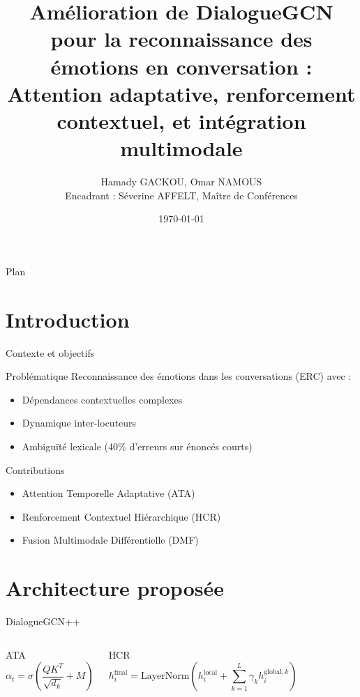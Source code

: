 \documentclass[10pt, aspectratio=169]{beamer} %
\title[Amélioration de DialogueGCN]{\large Amélioration de DialogueGCN pour la reconnaissance des émotions en conversation : \\ Attention adaptative, renforcement contextuel, et intégration multimodale}
\author[Hamady GACKOU, Omar NAMOUS]{Hamady GACKOU, Omar NAMOUS \\ \small Encadrant : Séverine AFFELT, Maître de Conférences}
\institute{Université Paris Cité \\ Master 1 AMSD}
\date{\today}
\begin{document}
\begin{frame}[plain]
    \titlepage
\end{frame}

\begin{frame}{Plan}
    \tableofcontents[hideallsubsections]
\end{frame}

\section{Introduction}
\begin{frame}{Contexte et objectifs}
    \begin{block}{Problématique}
        Reconnaissance des émotions dans les conversations (ERC) avec :
        \begin{itemize}
            \item Dépendances contextuelles complexes
            \item Dynamique inter-locuteurs
            \item Ambiguïté lexicale (40\% d'erreurs sur énoncés courts)
        \end{itemize}
    \end{block}
    
    \begin{block}{Contributions}
        \begin{itemize}
            \item Attention Temporelle Adaptative (ATA)
            \item Renforcement Contextuel Hiérarchique (HCR)
            \item Fusion Multimodale Différentielle (DMF)
        \end{itemize}
    \end{block}
    
    \footnotesize
\end{frame}

\section{Architecture proposée}
\begin{frame}{DialogueGCN++}
    \centering
    
    \begin{columns}
        \begin{block}{ATA}
            \[
            \alpha_t = \sigma\left(\frac{QK^T}{\sqrt{d_k}} + M\right)
            \]
        \end{block}
        
        \begin{block}{HCR}
            \[
            h_i^{\text{final}} = \text{LayerNorm}(h_i^{\text{local}} + \sum_{k=1}^L \gamma_k h_i^{\text{global},k})
            \]
        \end{block}
    \end{columns}
    
    \footnotesize
\end{frame}
\end{document}
